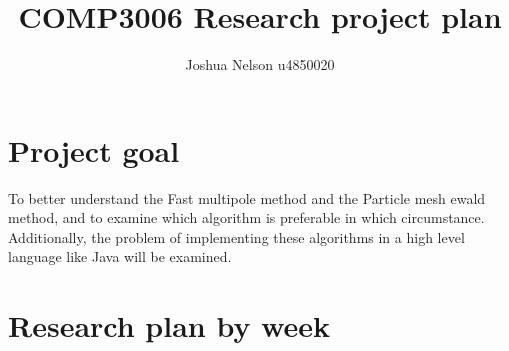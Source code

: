 \documentclass[11pt,a4paper,oneside]{article}
\begin{document}
\title{COMP3006 Research project plan}
\author{Joshua Nelson u4850020}
\maketitle
\section*{Project goal}
To better understand the Fast multipole method and the Particle mesh ewald method, and to examine which algorithm is preferable in which circumstance. Additionally, the problem of implementing these algorithms in a high level language like Java will be examined.
\section*{Research plan by week}
\end{document}
